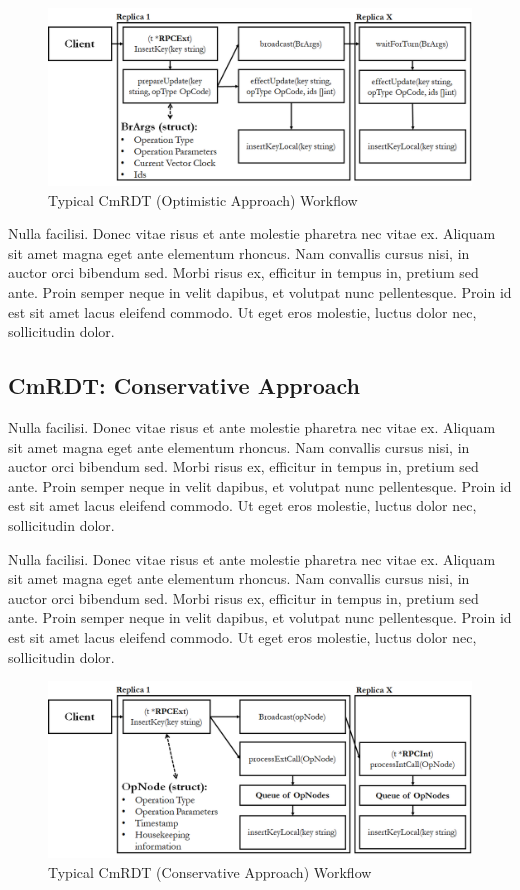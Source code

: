 \documentclass[sigconf,nonacm,11pt]{acmart}
\begin{document}
\begin{figure}[h]
  \centering
  \includegraphics[width=15.5cm]{Fig4CmRDTB}
  \caption{Typical CmRDT (Optimistic Approach) Workflow}
  \label{fig:cmrdtb}
\end{figure}

Nulla facilisi. Donec vitae risus et ante molestie pharetra nec vitae ex. Aliquam sit amet magna eget ante elementum rhoncus. Nam convallis cursus nisi, in auctor orci bibendum sed. Morbi risus ex, efficitur in tempus in, pretium sed ante. Proin semper neque in velit dapibus, et volutpat nunc pellentesque. Proin id est sit amet lacus eleifend commodo. Ut eget eros molestie, luctus dolor nec, sollicitudin dolor.

\subsection{CmRDT: Conservative Approach}

Nulla facilisi. Donec vitae risus et ante molestie pharetra nec vitae ex. Aliquam sit amet magna eget ante elementum rhoncus. Nam convallis cursus nisi, in auctor orci bibendum sed. Morbi risus ex, efficitur in tempus in, pretium sed ante. Proin semper neque in velit dapibus, et volutpat nunc pellentesque. Proin id est sit amet lacus eleifend commodo. Ut eget eros molestie, luctus dolor nec, sollicitudin dolor.

Nulla facilisi. Donec vitae risus et ante molestie pharetra nec vitae ex. Aliquam sit amet magna eget ante elementum rhoncus. Nam convallis cursus nisi, in auctor orci bibendum sed. Morbi risus ex, efficitur in tempus in, pretium sed ante. Proin semper neque in velit dapibus, et volutpat nunc pellentesque. Proin id est sit amet lacus eleifend commodo. Ut eget eros molestie, luctus dolor nec, sollicitudin dolor.

\begin{figure}[h]
  \centering
  \includegraphics[width=15.5cm]{Fig5CmRDTQ1}
  \caption{Typical CmRDT (Conservative Approach) Workflow}
  \label{fig:cmrdtq1}
\end{figure}
\end{document}
